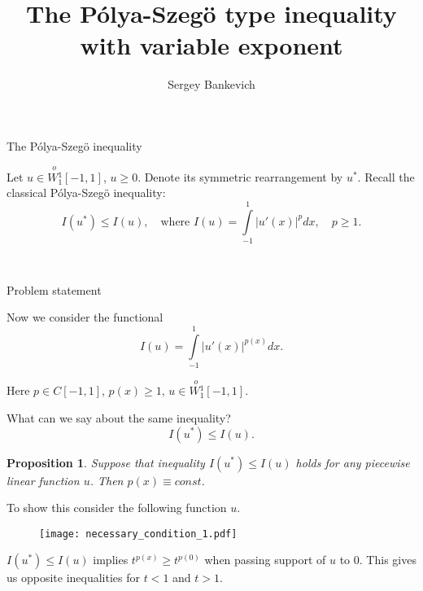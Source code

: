 \documentclass{beamer}\usepackage[]{graphicx}\usepackage[]{color}
\title{The P\'olya-Szeg\"o type inequality with variable exponent}
\author{Sergey Bankevich}
\institute{Saint Petersburg State University, Russia\\
\bigskip
Suzdal, 2016}
\date {
}
\renewcommand{\ge}{\geqslant}
\renewcommand{\le}{\leqslant}
\newcommand{\Wf}{\stackrel{o\ }{W{}_1^1}}
\newtheorem{prop}{Proposition}
\begin{document}
\begin{frame}
  \titlepage
\end{frame}

\begin{frame}{The P\'olya-Szeg\"o inequality}

Let $u \in \Wf[-1, 1]$, $u \ge 0$.
Denote its symmetric rearrangement by $u^*$.
Recall the classical P\'olya-Szeg\"o inequality:
$$I(u^*) \le I(u), \quad \mbox{where } I(u) = \int\limits_{-1}^1 |u'(x)|^p dx, \quad p \ge 1.$$

\begin{figure}
  \begin{center}
    \mbox{
    }
  \end{center}
\end{figure}

\end{frame}


\begin{frame}{Problem statement}

Now we consider the functional
{\Large 
\begin{equation*}
I(u) = \int\limits_{-1}^1 |u'(x)|^{p(x)} dx.
\label{sfunc}
\end{equation*}
}

Here $p \in C[-1, 1]$, $p(x) \ge 1$, $u \in \Wf[-1, 1]$.


\bigskip
What can we say about the same inequality?
{\Large 
\begin{equation*}
I(u^*) \le I(u).
\label{ineq}
\end{equation*}
}

\end{frame}


\begin{frame}{}

\begin{prop}
Suppose that inequality $I(u^*) \le I(u)$ holds for any piecewise linear function $u$.
Then $p(x) \equiv const$.
\end{prop}

To show this consider the following function $u$.
\begin{figure}
	\texttt{[image: necessary\_condition\_1.pdf]}
\end{figure}
$I(u^*) \le I(u)$ implies $t^{p(x)} \ge t^{p(0)}$ when passing support of $u$ to $0$.
This gives us opposite inequalities for $t < 1$ and $t > 1$.


\end{frame}
\end{document}
